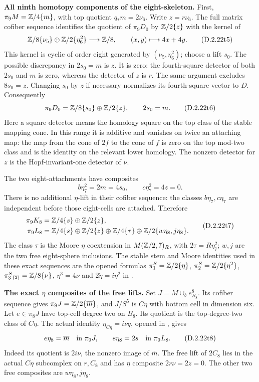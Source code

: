 \medskip\noindent
\textbf{All ninth homotopy components of the eight-skeleton.}
First, $\pi_9M=\mathbb Z/4\{m\}$, with top quotient
$q_*m=2\nu_6$.  Write $z=r\nu_6$.
The full matrix cofiber sequence identifies the quotient of
$\pi_9D_0$ by $\mathbb Z/2\{z\}$ with the kernel of
\[
 \mathbb Z/8\{\nu_5\}\oplus\mathbb Z/2\{\eta_6^2\}
       \longrightarrow\mathbb Z/8,
       \qquad (x,y)\longmapsto4x+4y.
 \tag{D.2.22t5}
\]
This kernel is cyclic of order eight generated by
$(\nu_5,\eta_6^2)$; choose a lift $s_0$.
The possible discrepancy in $2s_0=m$ is $z$.
It is zero: the fourth-square detector of both $2s_0$ and
$m$ is zero, whereas the detector of $z$ is $r$.
The same argument excludes $8s_0=z$.
Changing $s_0$ by $z$ if necessary normalizes its
fourth-square vector to $D$.  Consequently
\[
 \pi_9D_0=\mathbb Z/8\{s_0\}\oplus\mathbb Z/2\{z\},
       \qquad2s_0=m.
 \tag{D.2.22t6}
\]
Here a square detector means the homology square on the top
class of the stable mapping cone.  In this range it is additive
and vanishes on twice an attaching map: the map from the cone
of $2f$ to the cone of $f$ is zero on the top mod-two class
and is the identity on the relevant lower homology.
The nonzero detector for $z$ is the Hopf-invariant-one
detector of $\nu$.

The two eight-attachments have composites
\[
 b\eta_7^2=2m=4s_0,
       \qquad c\eta_7^2=4z=0.
\]
There is no additional $\eta$-lift in their cofiber sequence:
the classes $b\eta_7,c\eta_7$ are independent before those
eight-cells are attached.  Therefore
\[
 \begin{split}
 \pi_9K_8&=\mathbb Z/4\{s\}\oplus\mathbb Z/2\{z\},\\
 \pi_9L_8&=\mathbb Z/4\{s\}\oplus\mathbb Z/2\{z\}
     \oplus\mathbb Z/4\{\tau\}
     \oplus\mathbb Z/2\{w\eta_8,j\eta_8\}.
 \end{split}
 \tag{D.2.22t7}
\]
The class $\tau$ is the Moore $\eta$ coextension in
$M(\mathbb Z/2,7)_R$, with $2\tau=R\eta_7^2$;
$w,j$ are the two free eight-sphere inclusions.
The stable stem and Moore identities used in these exact
sequences are the opened formulas
$\pi_1^S=\mathbb Z/2\{\eta\}$,
$\pi_2^S=\mathbb Z/2\{\eta^2\}$,
$\pi_3^S{}_{(2)}=\mathbb Z/8\{\nu\}$,
$\eta^3=4\nu$ and $2\widetilde\eta=i\eta^2$ in
\cite[\S2, (2.1)--(2.2), p.~149]{I_Oka1986}.

\medskip\noindent
\textbf{The exact $\eta$ composites of the free lifts.}
Set $J=M\cup_b e^8_{B_8}$.
Its cofiber sequence gives $\pi_9J=\mathbb Z/2\{\overline m\}$,
and $J/S^5$ is $C\eta$ with bottom cell in dimension six.
Let $e\in\pi_8J$ have top-cell degree two on $B_8$.
Its quotient is the top-degree-two class of $C\eta$.
The actual identity
$\eta_{C\eta}=i\nu q$, opened in
\cite[(8.4), p.~1279]{EH5AngeltveitRognes2005}, gives
\[
 e\eta_8=\overline m\quad\hbox{in }\pi_9J,
       \qquad e\eta_8=2s\quad\hbox{in }\pi_9L_8.
 \tag{D.2.22t8}
\]
Indeed its quotient is $2i\nu$, the nonzero image of
$\overline m$.  The free lift of $2C_8$ lies in the actual
$C\eta$ subcomplex on $r,C_8$ and has $\eta$ composite
$2r\nu=2z=0$.  The other two free composites are
$w\eta_8,j\eta_8$.

